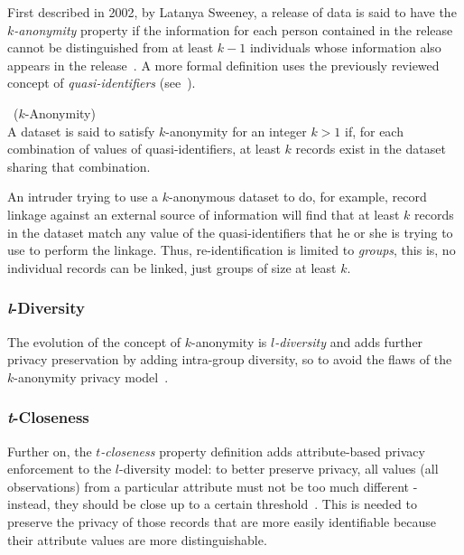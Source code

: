 First described in 2002, by Latanya Sweeney, a release of data is said to have the \textit{$k$-anonymity} property if the information for each person contained in the release cannot be distinguished from at least $k-1$ individuals whose information also appears in the release~\citep{Sweeney:kAnonymity}. A more formal definition uses the previously reviewed concept of \textit{quasi-identifiers} (see~).

\begin{definition}~($k$-Anonymity)\\
A dataset is said to satisfy $k$-anonymity for an integer $k > 1$ if, for each combination of values of quasi-identifiers, at least $k$ records exist in the dataset sharing that combination.~\citep{Domingo:EnhancingDiffPrivMicroaggregation}
\end{definition}

An intruder trying to use a $k$-anonymous dataset to do, for example, record linkage against an external source of information will find that at least $k$ records in the dataset match any value of the quasi-identifiers that he or she is trying to use to perform the linkage. Thus, re-identification is limited to \textit{groups}, this is, no individual records can be linked, just groups of size at least $k$.

\subsubsection{\textit{l}-Diversity}

The evolution of the concept of $k$-anonymity is \textit{$l$-diversity} and adds further privacy preservation by adding intra-group diversity, so to avoid the flaws of the $k$-anonymity privacy model~\citep{Machanavajjhala:lDiversity}.

\subsubsection{\textit{t}-Closeness}

Further on, the \textit{$t$-closeness} property definition adds attribute-based privacy enforcement to the $l$-diversity model: to better preserve privacy, all values (all observations) from a particular attribute must not be too much different - instead, they should be close up to a certain threshold~\citep{Ninghui:tCloseness}. This is needed to preserve the privacy of those records that are more easily identifiable because their attribute values are more distinguishable.

